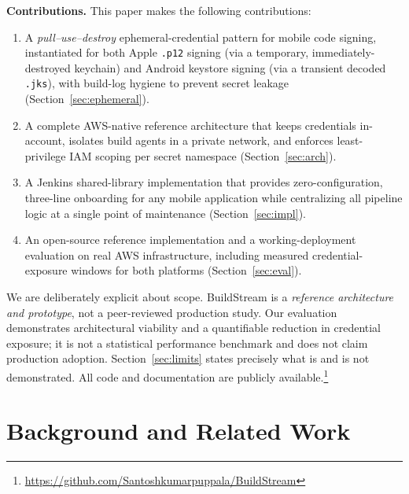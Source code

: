 \documentclass[conference]{IEEEtran}
\begin{document}
\textbf{Contributions.} This paper makes the following contributions:
\begin{enumerate}
  \item A \emph{pull--use--destroy} ephemeral-credential pattern for mobile code
  signing, instantiated for both Apple \texttt{.p12} signing (via a temporary,
  immediately-destroyed keychain) and Android keystore signing (via a transient
  decoded \texttt{.jks}), with build-log hygiene to prevent secret leakage
  (Section~\ref{sec:ephemeral}).
  \item A complete AWS-native reference architecture that keeps credentials
  in-account, isolates build agents in a private network, and enforces
  least-privilege IAM scoping per secret namespace
  (Section~\ref{sec:arch}).
  \item A Jenkins shared-library implementation that provides zero-configuration,
  three-line onboarding for any mobile application while centralizing all
  pipeline logic at a single point of maintenance
  (Section~\ref{sec:impl}).
  \item An open-source reference implementation and a working-deployment
  evaluation on real AWS infrastructure, including measured credential-exposure
  windows for both platforms (Section~\ref{sec:eval}).
\end{enumerate}

We are deliberately explicit about scope. BuildStream is a \emph{reference
architecture and prototype}, not a peer-reviewed production study. Our
evaluation demonstrates architectural viability and a quantifiable reduction in
credential exposure; it is not a statistical performance benchmark and does not
claim production adoption. Section~\ref{sec:limits} states precisely what is and
is not demonstrated. All code and documentation are publicly
available.\footnote{\url{https://github.com/Santoshkumarpuppala/BuildStream}}

\section{Background and Related Work}\label{sec:background}
\end{document}
